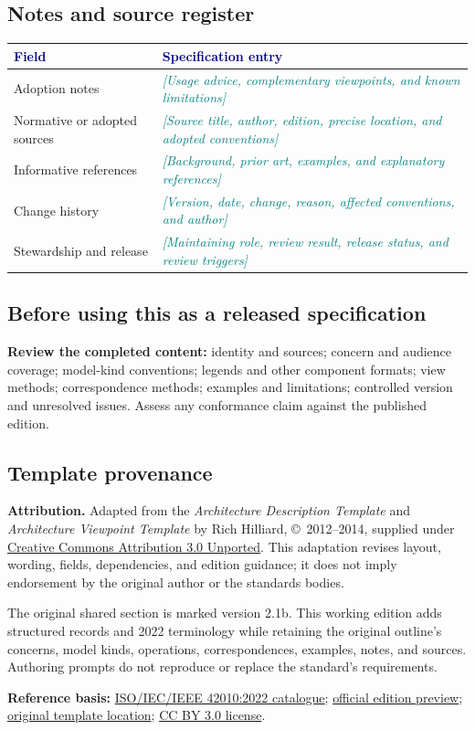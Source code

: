 \documentclass[11pt,letterpaper]{article}
\newcommand{\FillIn}[1]{\textcolor{Teal}{\sffamily\itshape[#1]}}
\newcommand{\TableHead}[1]{\textcolor{Navy}{\sffamily\bfseries#1}}
\newcommand{\TemplateAttribution}{%
  \textbf{Attribution.} Adapted from the \emph{Architecture Description Template}
  and \emph{Architecture Viewpoint Template} by Rich Hilliard,
  \copyright\ 2012--2014, supplied under
  \href{https://creativecommons.org/licenses/by/3.0/}{Creative Commons Attribution 3.0 Unported}.
  This adaptation revises layout, wording, fields, dependencies, and edition guidance;
  it does not imply endorsement by the original author or the standards bodies.}
\begin{document}
\subsection{Notes and source register}
{\small
\begin{tabularx}{\linewidth}{@{}L{1.38in}Y@{}}
\toprule
\TableHead{Field} & \TableHead{Specification entry}\\
\midrule
Adoption notes & \FillIn{Usage advice, complementary viewpoints, and known limitations}\\
Normative or adopted sources & \FillIn{Source title, author, edition, precise location, and adopted conventions}\\
Informative references & \FillIn{Background, prior art, examples, and explanatory references}\\
Change history & \FillIn{Version, date, change, reason, affected conventions, and author}\\
Stewardship and release & \FillIn{Maintaining role, review result, release status, and review triggers}\\
\bottomrule
\end{tabularx}}

\subsection{Before using this as a released specification}
\textbf{Review the completed content:} identity and sources; concern and audience
coverage; model-kind conventions; legends and other component formats; view
methods; correspondence methods; examples and limitations; controlled version
and unresolved issues. Assess any conformance claim against the published edition.

\subsection{Template provenance}
{\footnotesize\color{Muted}\TemplateAttribution\par
The original shared section is marked version 2.1b. This working edition adds
structured records and 2022 terminology while retaining the original outline's
concerns, model kinds, operations, correspondences, examples, notes, and sources.
Authoring prompts do not reproduce or replace the standard's requirements.\par}
{\footnotesize
\textbf{Reference basis:}
\href{https://www.iso.org/standard/74393.html}{ISO/IEC/IEEE 42010:2022 catalogue};
\href{https://webstore.ansi.org/preview-pages/iso/preview_iso\%2Biec\%2Bieee\%2B42010-2022.pdf}{official edition preview};
\href{http://www.iso-architecture.org/42010/templates/}{original template location};
\href{https://creativecommons.org/licenses/by/3.0/}{CC BY 3.0 license}.\par}
\end{document}
